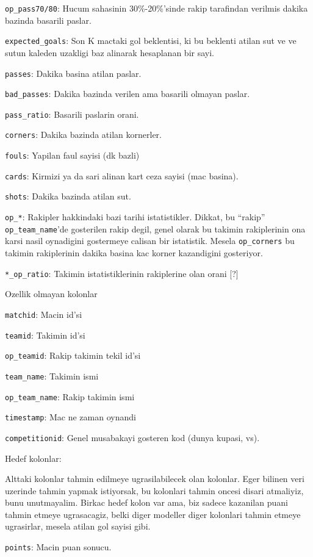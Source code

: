 \documentclass[12pt,fleqn]{article}\usepackage{../common}
\begin{document}
\verb!op_pass70/80!: Hucum sahasinin 30\%-20\%'sinde rakip tarafindan
verilmis dakika bazinda basarili paslar.

\verb!expected_goals!: Son K mactaki gol beklentisi, ki bu beklenti atilan
sut ve ve sutun kaleden uzakligi baz alinarak hesaplanan bir sayi.

\verb!passes!: Dakika basina atilan paslar.

\verb!bad_passes!: Dakika bazinda verilen ama basarili olmayan paslar.

\verb!pass_ratio!: Basarili paslarin orani.

\verb!corners!: Dakika bazinda atilan kornerler.

\verb!fouls!: Yapilan faul sayisi (dk bazli)

\verb!cards!: Kirmizi ya da sari alinan kart ceza sayisi (mac basina).

\verb!shots!: Dakika bazinda atilan sut.

\verb!op_*!: Rakipler hakkindaki bazi tarihi istatistikler. Dikkat, bu
``rakip'' \verb!op_team_name!'de gosterilen rakip degil, genel olarak bu
takimin rakiplerinin ona karsi nasil oynadigini gostermeye calisan bir
istatistik. Mesela \verb!op_corners! bu takimin rakiplerinin dakika basina
kac korner kazandigini gosteriyor.

\verb!*_op_ratio!: Takimin istatistiklerinin rakiplerine olan orani [?]

Ozellik olmayan kolonlar

\verb!matchid!: Macin id'si

\verb!teamid!: Takimin id'si

\verb!op_teamid!: Rakip takimin tekil id'si

\verb!team_name!: Takimin ismi

\verb!op_team_name!: Rakip takimin ismi

\verb!timestamp!: Mac ne zaman oynandi

\verb!competitionid!: Genel musabakayi gosteren kod (dunya kupasi, vs).

Hedef kolonlar:

Alttaki kolonlar tahmin edilmeye ugrasilabilecek olan kolonlar. Eger
bilinen veri uzerinde tahmin yapmak istiyorsak, bu kolonlari tahmin oncesi
disari atmaliyiz, bunu unutmayalim. Birkac hedef kolon var ama, biz
sadece kazanilan puani tahmin etmeye ugrasacagiz, belki diger modeller
diger kolonlari tahmin etmeye ugrasirlar, mesela atilan gol sayisi gibi.

\verb!points!: Macin puan sonucu.
\end{document}
